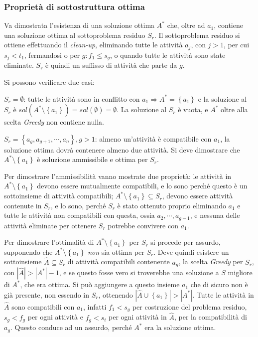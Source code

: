 \subsubsection{Proprietà di sottostruttura ottima}

Va dimostrata l'esistenza di una soluzione ottima $A^*$ che, oltre ad $a_1$, contiene una soluzione ottima al sottoproblema residuo $S_r$. 
Il sottoproblema residuo si ottiene effettuando il \emph{clean-up}, eliminando tutte le attività $a_j$, con $j>1$, per cui $s_j < t_1$, fermandosi o per $g : f_1 \leq s_g$, o quando tutte le attività sono state eliminate. $S_r$ è quindi un suffisso di attività che parte da $g$.

Si possono verificare due casi:

$S_r = \emptyset $: tutte le attività sono in conflitto con $a_1 \Rightarrow A^*=\left\{ a_1 \right\}$
e la soluzione al $S_r$ è $sol( A^* \setminus \left\{ a_1 \right\} ) = sol ( \emptyset ) = \emptyset$.
La soluzione al $S_r$ è vuota, e $A^*$ oltre alla scelta \emph{Greedy} non contiene nulla.

$S_r = \left\{ a_g, a_{g+1}, \cdots, a_n \right\}, g>1$: almeno un'attività è compatibile con $a_1$, la soluzione ottima dovrà contenere almeno due attività. Si deve dimostrare che $A^* \setminus \left\{ a_1 \right\}$ è soluzione ammissibile e ottima per $S_r$.

Per dimostrare l'ammissibilità vanno mostrate due proprietà: le attività in $A^* \setminus \left\{ a_1 \right\}$ devono essere mutualmente compatibili, e lo sono perché questo è un sottoinsieme di attività compatibili; $A^* \setminus \left\{ a_1 \right\} \subseteq S_r$, devono essere attività contenute in $S_r$, e lo sono, perché $S_r$ è stato ottenuto proprio eliminando $a_1$ e tutte le attività non compatibili con questa, ossia $a_2, \cdots, a_{g-1}$, e nessuna delle attività eliminate per ottenere $S_r$ potrebbe convivere con $a_1$.

Per dimostrare l'ottimalità di $A^* \setminus \left\{ a_1 \right\}$ per $S_r$ si procede per assurdo, supponendo che $A^* \setminus \left\{ a_1 \right\}$ \emph{non} sia ottima per $S_r$. Deve quindi esistere un sottoinsieme $\widehat{A} \subseteq S_r$ di attività compatibili
contenente $a_g$, la scelta \emph{Greedy} per $S_r$,
con $|\widehat{A}| > |A^*|-1$, e se questo fosse vero si troverebbe una soluzione a $S$ migliore di $A^*$, che era ottima.
Si può aggiungere a questo insieme $a_1$ che di sicuro non è già presente, non essendo in $S_r$, ottenendo $|\widehat{A} \cup \left\{ a_1 \right\} | > |A^*|$. 
Tutte le attività in $\widehat{A}$ sono compatibili con $a_1$, infatti $f_1 < s_g$ per costruzione del problema residuo, $s_g < f_g$ per ogni attività e $f_g < s_i$ per ogni attività in $\widehat{A}$, per la compatibilità di $a_g$.
Questo conduce ad un assurdo, perché $A^*$ era la soluzione ottima.

